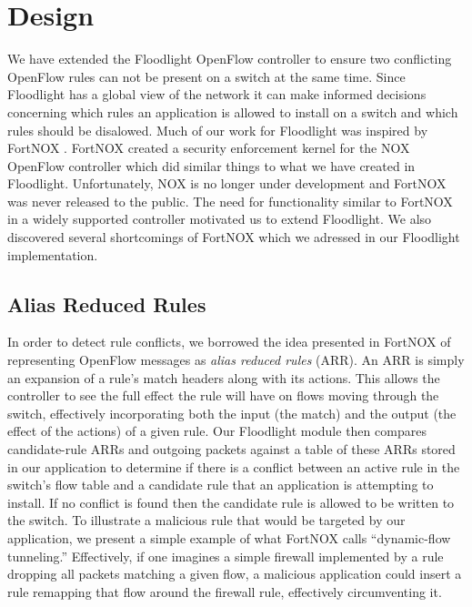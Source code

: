 \section{Design}
\label{sec:design}

We have extended the Floodlight OpenFlow controller to ensure two conflicting OpenFlow rules can not be present on a switch at the same time.
Since Floodlight has a global view of the network it can make informed decisions concerning which rules an application is allowed to install on a switch and which rules should be disalowed.
Much of our work for Floodlight was inspired by FortNOX \cite{Porras:2012:SEK:2342441.2342466}.
FortNOX created a security enforcement kernel for the NOX OpenFlow controller \cite{Gude:2008:NTO:1384609.1384625} which did similar things to what we have created in Floodlight.
Unfortunately, NOX is no longer under development and FortNOX was never released to the public.
The need for functionality similar to FortNOX in a widely supported controller motivated us to extend Floodlight.
We also discovered several shortcomings of FortNOX which we adressed in our Floodlight implementation.

\subsection{Alias Reduced Rules}
\label{subsec:arr}
In order to detect rule conflicts, we borrowed the idea presented in FortNOX of representing OpenFlow messages as \emph{alias reduced rules} (ARR).
An ARR is simply an expansion of a rule's match headers along with its actions.
This allows the controller to see the full effect the rule will have on flows moving through the switch, effectively incorporating both the input (the match) and the output (the effect of the actions) of a given rule.
Our Floodlight module then compares candidate-rule ARRs and outgoing packets against a table of these ARRs stored in our application to determine if there is a conflict between an active rule in the switch's flow table and a candidate rule that an application is attempting to install.
If no conflict is found then the candidate rule is allowed to be written to the switch.
To illustrate a malicious rule that would be targeted by our application, we present a simple example of what FortNOX calls ``dynamic-flow tunneling.'' Effectively, if one imagines a simple firewall implemented by a rule dropping all packets matching a given flow, a malicious application could insert a rule remapping that flow around the firewall rule, effectively circumventing it. 

